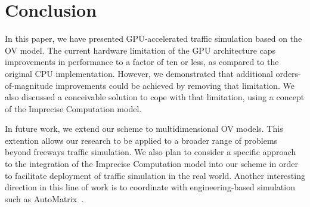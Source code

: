 \documentclass[times, 10pt, twocolumn]{article}
\begin{document}
\section{Conclusion}
\label{sec:conclusion}

In this paper, we have presented GPU-accelerated traffic simulation
based on the OV model.
The current hardware limitation of the GPU architecture caps
improvements in performance to a factor of ten or less, as compared to
the original CPU implementation.
However, we demonstrated that additional orders-of-magnitude
improvements could be achieved by removing that limitation.
We also discussed a conceivable solution to cope with that limitation,
using a concept of the Imprecise Computation model.

In future work, we extend our scheme to multidimensional OV models.
This extention allows our research to be applied to a broader range of
problems beyond freeways traffic simulation.
We also plan to consider a specific approach to the integration of the
Imprecise Computation model into our scheme in order to facilitate
deployment of traffic simulation in the real world.
Another interesting direction in this line of work is to coordinate with
engineering-based simulation such as AutoMatrix~\cite{Mangharam2011}.


{\footnotesize

}
\end{document}
